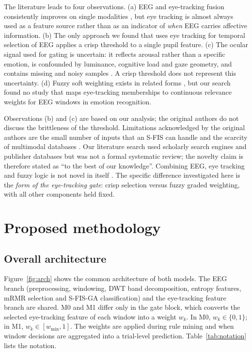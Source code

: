 \documentclass[11pt,a4paper]{article}
\begin{document}
The literature leads to four observations. (a) EEG and eye-tracking fusion consistently improves on single modalities \cite{Lu2015,Zheng2019,Liu2022}, but eye tracking is almost always used as a feature source rather than as an indicator of \emph{when} EEG carries affective information. (b) The only approach we found that uses eye tracking for temporal selection of EEG \cite{FarhadiSedehi2024a,FarhadiSedehi2024b} applies a crisp threshold to a single pupil feature. (c) The ocular signal used for gating is uncertain: it reflects arousal rather than a specific emotion, is confounded by luminance, cognitive load and gaze geometry, and contains missing and noisy samples \cite{Bradley2008,Mathot2018,Raiturkar2016,Holmqvist2012}. A crisp threshold does not represent this uncertainty. (d) Fuzzy soft weighting exists in related forms \cite{LinWang2002,Jacobs1991,Lu2015}, but our search found no study that maps eye-tracking memberships to continuous relevance weights for EEG windows in emotion recognition.

Observations (b) and (c) are based on our analysis; the original authors do not discuss the brittleness of the threshold. Limitations acknowledged by the original authors are the small number of inputs that an S-FIS can handle and the scarcity of multimodal databases \cite{FarhadiSedehi2024a}. Our literature search used scholarly search engines and publisher databases but was not a formal systematic review; the novelty claim is therefore stated as ``to the best of our knowledge''. Combining EEG, eye tracking and fuzzy logic is not novel in itself \cite{Lu2015,FarhadiSedehi2024a}. The specific difference investigated here is the \emph{form of the eye-tracking gate}: crisp selection versus fuzzy graded weighting, with all other components held fixed.

\section{Proposed methodology}
\label{sec:method}

\subsection{Overall architecture}
Figure~\ref{fig:arch} shows the common architecture of both models. The EEG branch (preprocessing, windowing, DWT band decomposition, entropy features, mRMR selection and S-FIS-GA classification) and the eye-tracking feature branch are shared. M0 and M1 differ only in the gate block, which converts the selected eye-tracking feature of each window into a weight $w_k$. In M0, $w_k \in \{0,1\}$; in M1, $w_k \in [w_{\min},1]$. The weights are applied during rule mining and when window decisions are aggregated into a trial-level prediction. Table~\ref{tab:notation} lists the notation.
\end{document}
